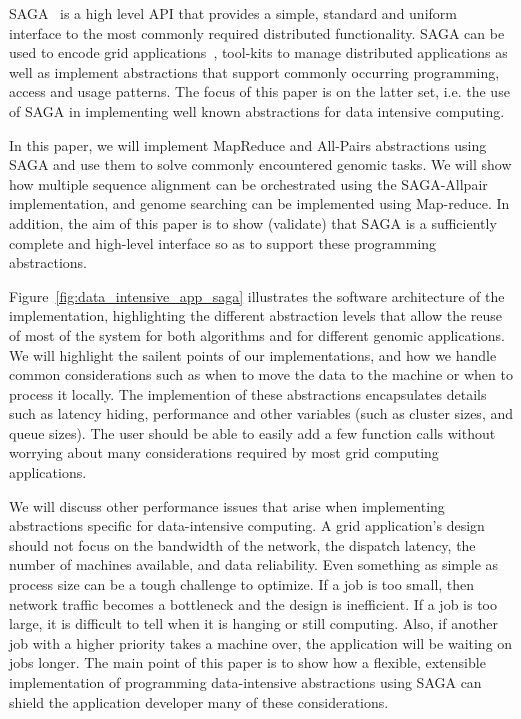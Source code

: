 \documentclass[a4paper,11pt]{article} \usepackage[utf8]{inputenc}
\begin{document}
SAGA~\cite{saga_gfd90} is a high level API that provides a simple,
standard and uniform interface to the most commonly required distributed
functionality.  SAGA can be used to encode grid
applications~\cite{saga_escience07, saga_tg08}, tool-kits to manage
distributed applications as well as implement abstractions that support
commonly occurring programming, access and usage patterns.  The focus of
this paper is on the latter set, i.e.  the use of SAGA in implementing
well known abstractions for data intensive computing.  

In this paper, we will implement MapReduce and All-Pairs abstractions
using SAGA and use them to solve commonly encountered genomic tasks.  We
will show how multiple sequence alignment can be orchestrated using the
SAGA-Allpair implementation, and genome searching can be implemented
using Map-reduce.  In addition, the aim of this paper is to show
(validate) that SAGA is a sufficiently complete and high-level interface
so as to support these programming abstractions.

Figure~\ref{fig:data_intensive_app_saga} illustrates the software
architecture of the implementation, highlighting the different
abstraction levels that allow the reuse of most of the system for both
algorithms and for different genomic applications.  We will highlight
the sailent points of our implementations, and how we handle common
considerations such as when to move the data to the machine or when to
process it locally.  The implemention of these abstractions encapsulates
details such as latency hiding, performance and other variables (such as
cluster sizes, and queue sizes).  The user should be able to easily add
a few function calls without worrying about many considerations required
by most grid computing applications.

We will discuss other performance issues that arise when implementing
abstractions specific for data-intensive computing.  A grid
application's design should not focus on the bandwidth of the network,
the dispatch latency, the number of machines available, and data
reliability.  Even something as simple as process size can be a tough
challenge to optimize.  If a job is too small, then network traffic
becomes a bottleneck and the design is inefficient.  If a job is too
large, it is difficult to tell when it is hanging or still computing.
Also, if another job with a higher priority takes a machine over, the
application will be waiting on jobs longer.  The main point of this
paper is to show how a flexible, extensible implementation of
programming data-intensive abstractions using SAGA can shield the
application developer many of these considerations.
\end{document}
